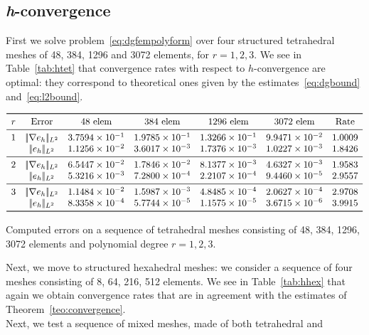 \documentclass[12pt, a4paper]{article}
\theoremstyle{definition}
\theoremstyle{plain}
\theoremstyle{plain}
\theoremstyle{definition}
\begin{document}
\subsection{\textit{h}-convergence}
First we solve problem~\eqref{eq:dgfempolyform} over four structured 
tetrahedral meshes of 48, 
384, 1296 and 3072 elements, for $r=1,2,3$. We see in Table~\ref{tab:htet} that 
convergence rates with respect to $h$-convergence are optimal: they correspond 
to theoretical ones given by the estimates~\eqref{eq:dgbound} 
and~\eqref{eq:l2bound}.\\
\begin{table}[h]\footnotesize
	\centering
	\[
	\begin{array}{ccccccc}
	\toprule
	r & \text{Error} & \text{48 elem} & \text{384 elem} & \text{1296 elem} & 
	\text{3072 elem} & \text{Rate} \\ 
	\midrule
	1 & |\!|\nabla e_{h}|\!|_{L^2}   & 3.7594 \times 10^{-1} & 1.9785 \times 10^{-1} & 1.3266 \times 10^{-1} & 9.9471 \times 10^{-2} & 1.0009\\
	& |\!|e_{h}|\!|_{L^2} & 1.1256 \times 10^{-2} & 3.6017 \times 10^{-3} & 1.7376 \times 10^{-3} & 1.0227 \times 10^{-3} & 1.8426\\
	\midrule
	2 & |\!|\nabla e_{h}|\!|_{L^2}   & 6.5447 \times 10^{-2} & 1.7846 \times 10^{-2} & 8.1377 \times 10^{-3} & 4.6327 \times 10^{-3} & 1.9583\\
	& |\!|e_{h}|\!|_{L^2} & 5.3216 \times 10^{-3} & 7.2800 \times 10^{-4} & 2.2107 \times 10^{-4} & 9.4460 \times 10^{-5} & 2.9557\\
	\midrule
	3 & |\!|\nabla e_{h}|\!|_{L^2}   & 1.1484 \times 10^{-2} & 1.5987 \times 10^{-3} & 4.8485 \times 10^{-4} & 2.0627 \times 10^{-4} & 2.9708\\
	& |\!|e_{h}|\!|_{L^2} & 8.3358 \times 10^{-4} & 5.7744 \times 10^{-5} & 1.1575 \times 10^{-5} & 3.6715 \times 10^{-6} & 3.9915\\
	\bottomrule
	\end{array}
	\]
	\caption{Computed errors on a sequence of tetrahedral meshes consisting of 
	48, 384, 1296, 3072 elements and polynomial degree $r=1,2,3$.} \label{tab:htet}
\end{table}
Next, we move to structured hexahedral meshes: we consider a sequence of four 
meshes consisting of 8, 64, 216, 512 elements. We see in 
Table~\ref{tab:hhex} that again we obtain convergence rates that are in 
agreement with the estimates of Theorem~\ref{teo:convergence}.\\
Next, we test a sequence of mixed meshes, made of both tetrahedral and 
\end{document}
